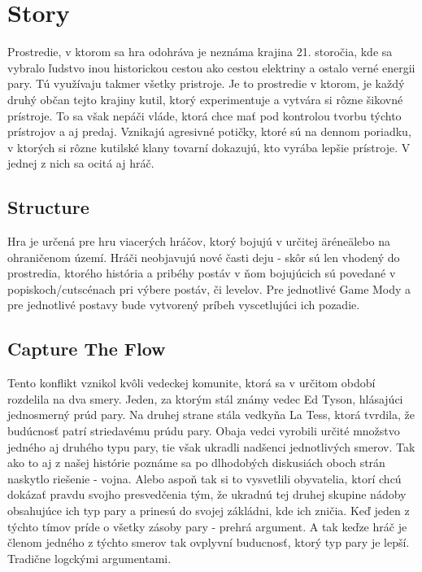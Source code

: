 \documentclass[a4paper]{report}
\begin{document}
\chapter{Story}
Prostredie, v ktorom sa hra odohráva je neznáma krajina 21. storočia, kde sa vybralo ľudstvo inou historickou cestou ako cestou elektriny a ostalo verné energii pary. Tú využívaju takmer všetky pristroje. Je to  prostredie v ktorom, je každý druhý občan tejto krajiny kutil, ktorý experimentuje a vytvára si rôzne šikovné prístroje. To sa však nepáči vláde, ktorá chce mať pod kontrolou tvorbu týchto prístrojov a aj predaj. Vznikajú agresivné potičky, ktoré sú na dennom poriadku, v ktorých si rôzne kutilské klany tovarní dokazujú, kto vyrába lepšie prístroje. V jednej z nich sa ocitá aj hráč. 

\section{Structure}
Hra je určená pre hru viacerých hráčov, ktorý bojujú v určitej \"aréne\" alebo na ohraničenom území. Hráči neobjavujú nové časti deju - skôr sú len vhodený do prostredia, ktorého história a pribéhy postáv v ňom bojujúcich sú povedané v popiskoch/cutscénach pri výbere postáv, či levelov. Pre jednotlivé Game Mody a pre jednotlivé postavy bude vytvorený príbeh vyscetlujúci ich pozadie.

\section{Capture The Flow}
Tento konflikt vznikol kvôli vedeckej komunite, ktorá sa v určitom období rozdelila na dva smery. Jeden, za ktorým stál známy vedec Ed Tyson, hlásajúci jednosmerný prúd pary. Na druhej strane stála vedkyňa La Tess, ktorá tvrdila, že budúcnosť patrí striedavému prúdu pary. Obaja vedci vyrobili určité množstvo jedného aj druhého typu pary, tie však ukradli nadšenci jednotlivých smerov. Tak ako to aj z našej histórie poznáme sa po dlhodobých diskusiách oboch strán naskytlo riešenie - vojna. Alebo aspoň tak si to vysvetlili obyvatelia, ktorí chcú dokázať pravdu svojho presvedčenia tým, že ukradnú tej druhej skupine nádoby obsahujúce ich typ pary a prinesú do svojej zákládni, kde ich zničia. Keď jeden z týchto tímov príde o všetky zásoby pary - prehrá argument. A tak keďze hráč je členom jedného z týchto smerov tak ovplyvní buducnosť, ktorý typ pary je lepší. Tradične logckými argumentami.
\end{document}
